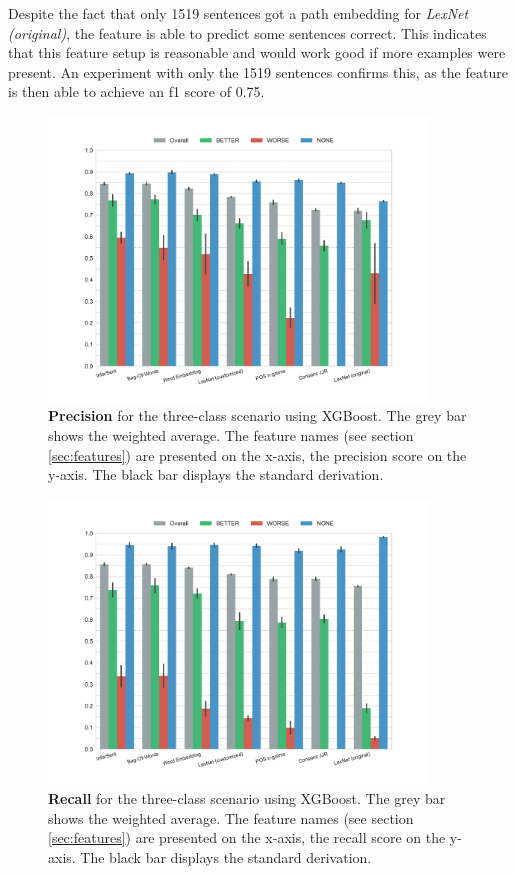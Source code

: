 Despite the fact that only 1519 sentences got a path embedding for \emph{LexNet (original)}, the feature is able to predict some sentences correct. This indicates that this feature setup is reasonable and would work good if more examples were present. An experiment with only the 1519 sentences confirms this, as the feature is then able to achieve an f1 score of 0.75.\newline


\begin{figure}[htbp]
         \caption{\textbf{Precision} for the three-class scenario using XGBoost. The grey bar shows the weighted average. The feature names (see section \ref{sec:features}) are presented on the x-axis, the precision score on the y-axis. The black bar displays the standard derivation.} 
    \label{fig:3_precision}
 \centering
	\includegraphics[width=0.9\textwidth]{images/experiments/precision-False}
\end{figure}

  \begin{figure}[htbp]
              \caption{\textbf{Recall} for the three-class scenario using XGBoost. The grey bar shows the weighted average. The feature names (see section \ref{sec:features}) are presented on the x-axis, the recall score on the y-axis. The black bar displays the standard derivation.} 
       \label{fig:3_recall}
 \centering
	\includegraphics[width=0.9\textwidth]{images/experiments/recall-False}
\end{figure}

